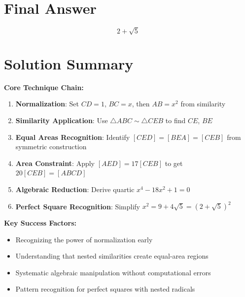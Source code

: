 \documentclass[]{article}
\begin{document}
\section*{Final Answer}
\[\boxed{2 + \sqrt{5}}\]

\section*{Solution Summary}

\textbf{Core Technique Chain:}
\begin{enumerate}
    \item \textbf{Normalization}: Set $CD = 1$, $BC = x$, then $AB = x^2$ from similarity
    \item \textbf{Similarity Application}: Use $\triangle ABC \sim \triangle CEB$ to find $CE$, $BE$
    \item \textbf{Equal Areas Recognition}: Identify $[CED] = [BEA] = [CEB]$ from symmetric construction
    \item \textbf{Area Constraint}: Apply $[AED] = 17[CEB]$ to get $20[CEB] = [ABCD]$
    \item \textbf{Algebraic Reduction}: Derive quartic $x^4 - 18x^2 + 1 = 0$
    \item \textbf{Perfect Square Recognition}: Simplify $x^2 = 9 + 4\sqrt{5} = (2+\sqrt{5})^2$
\end{enumerate}

\textbf{Key Success Factors:}
\begin{itemize}
    \item Recognizing the power of normalization early
    \item Understanding that nested similarities create equal-area regions
    \item Systematic algebraic manipulation without computational errors
    \item Pattern recognition for perfect squares with nested radicals
\end{itemize}
\end{document}
